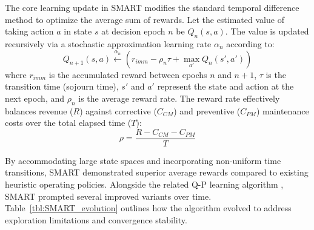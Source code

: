 \documentclass[12pt,oneside]{book}
\begin{document}
The core learning update in SMART modifies the standard temporal difference method to optimize the average sum of rewards. Let the estimated value of taking action $a$ in state $s$ at decision epoch $n$ be $Q_n(s,a)$. The value is updated recursively via a stochastic approximation learning rate $\alpha_n$ according to:
\begin{equation}\label{eq:SMART}
	Q_{n+1}(s,a) \xleftarrow{\alpha_n} \left( r_{imm} - \rho_n \tau + \max_{a'} Q_n(s',a') \right)
\end{equation}
where $r_{imm}$ is the accumulated reward between epochs $n$ and $n+1$, $\tau$ is the transition time (sojourn time), $s'$ and $a'$ represent the state and action at the next epoch, and $\rho_n$ is the average reward rate. The reward rate effectively balances revenue ($R$) against corrective ($C_{\scriptscriptstyle{CM}}$) and preventive ($C_{\scriptscriptstyle{PM}}$) maintenance costs over the total elapsed time ($T$):
\begin{equation}\label{eq:rho}
    \rho = \frac {R - C_{\scriptscriptstyle{CM}} - C_{\scriptscriptstyle{PM}}} {T}
\end{equation}

By accommodating large state spaces and incorporating non-uniform time transitions, SMART demonstrated superior average rewards compared to existing heuristic operating policies. Alongside the related Q-P learning algorithm \citep{gosavi2004qp}, SMART prompted several improved variants over time. Table~\ref{tbl:SMART_evolution} outlines how the algorithm evolved to address exploration limitations and convergence stability.
	
\end{document}
